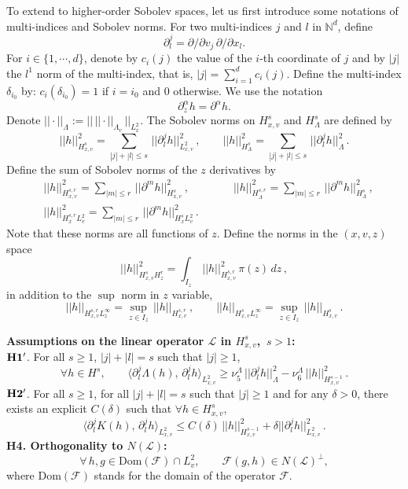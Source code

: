 \documentclass[final,onefignum,onetabnum]{siamart171218}
\begin{document}
To extend to higher-order Sobolev spaces, let us first introduce some notations of multi-indices and Sobolev norms.
For two multi-indices $j$ and $l$ in $\mathbb N^{d}$, define $$\partial_l^j = \partial/\partial v_j\, \partial/\partial x_l. $$
For $i\in\{1, \cdots, d\}$, denote by $c_i(j)$ the value of the $i$-th coordinate of $j$ and by $|j|$ the $l^1$ norm of the multi-index, that is,
$|j|=\sum_{i=1}^d c_i(j)$. Define the multi-index $\delta_{i_0}$ by: $c_i(\delta_{i_0})=1$ if $i=i_0$ and $0$ otherwise.
We use the notation $$\partial_z^{\alpha} h = \partial^{\alpha}h. $$
Denote $||\cdot||_{\Lambda}:= ||\, ||\cdot||_{\Lambda_v}\, ||_{L^2_x}$.
The Sobolev norms on $H^{s}_{x,v}$ and $H_{\Lambda}^s$ are defined by
$$||h||_{H_{x,v}^s}^2 = \sum_{|j|+|l|\leq s}\, ||\partial_l^j h||_{L^2_{x,v}}^2\,,\qquad
||h||_{H_{\Lambda}^s}^2 = \sum_{|j|+|l|\leq s}\, ||\partial_l^j h||_{\Lambda}^2\,.$$
Define the sum of Sobolev norms of the $z$ derivatives by
\begin{align*}
&\displaystyle  ||h||_{H_{x,v}^{s,r}}^2 = \sum_{|m|\leq r}\, ||\partial^m h||_{H_{x,v}^s}^2\,, \qquad\qquad
||h||_{H_{\Lambda}^{s,r}}^2 = \sum_{|m|\leq r}\, ||\partial^m h||_{H_{\Lambda}^s}^2\,, \\[2pt]
&\displaystyle ||h||_{H_{x}^{s,r}L_v^2}^2 = \sum_{|m|\leq r}\, ||\partial^m h||_{H_{x}^s L_v^2}^2\,.
\end{align*}
Note that these norms are all functions of $z$. Define the norms in the $(x,v,z)$ space
$$||h||_{H^{s}_{x,v}H_z^r}^2 = \int_{I_z}\, ||h||_{H_{x,v}^{s,r}}^2\, \pi(z)\, dz\,,$$
in addition to the $\sup$ norm in $z$ variable,
\begin{equation}\label{h_sup} ||h||_{H_{x,v}^{s,r} L_z^{\infty}}=\sup_{z\in I_z}\, ||h||_{H_{x,v}^{s,r}}\,, \qquad
||h||_{H_{x,v}^s L_z^{\infty}}=\sup_{z\in I_z}\, ||h||_{H_{x,v}^s}\,. 
\end{equation}

{\bf Assumptions on the linear operator $\mathcal L$ in $H^s_{x,v}$,\, $s>1$: }\\
$\bf {H1^{\prime}}$. For all $s\geq 1$, $|j|+|l|=s$ such that $|j|\geq 1$,
$$\forall h\in H^{s}, \qquad \langle \partial_l^j \Lambda(h),\, \partial_l^j h\rangle_{L^2_{x,v}} \geq \nu_5^{\Lambda}\,
||\partial_l^j h||_{\Lambda}^2 - \nu_6^{\Lambda}\, ||h||_{H^{s-1}_{x,v}}^2\,. $$
$\bf {H2^{\prime}}$. For all $s\geq 1$, for all $|j|+|l|=s$ such that $|j|\geq 1$ and for any $\delta>0$, there exists an explicit $C(\delta)$ such that
$\forall h\in H_{x,v}^s$,
$$\langle\partial_l^j K(h), \, \partial_l^j h\rangle_{L^2_{x,v}} \leq C(\delta)\, ||h||_{H^{s-1}_{x,v}}^2 + \delta ||\partial_l^j h||_{L^2_{x,v}}^2\,.$$
{\bf H4. Orthogonality to $N(\mathcal L)$:}
$$\forall\, h, g \in \text{Dom}(\mathcal F)\cap L_v^2, \qquad \mathcal F(g,h)\in N(\mathcal L)^{\perp}, $$
where $\text{Dom}(\mathcal F)$ stands for the domain of the operator $\mathcal F$.
\end{document}
